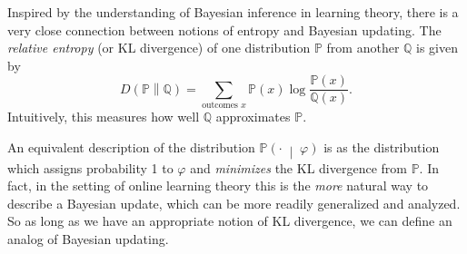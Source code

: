 \documentclass[12pt]{article}
\theoremstyle{definition}
\newcommand{\QQ}{\mathbb{Q}}
\newcommand{\Q}[1]{\QQ\of{#1}}
\newcommand{\of}[1]{\left(#1\right)}
\newcommand{\ofc}[2]{\left(#1\;\middle\vert\;#2\right)}
\newcommand{\ofcc}[2]{\left(#1\middle\| #2\right)}
\newcommand{\PP}{\mathbb{P}}
\newcommand{\Pc}[2]{\PP\ofc{#1}{#2}}
\renewcommand{\P}[1]{\mathbb{P}\of{#1}}
\newcommand{\vp}{\varphi}
\begin{document}
%
%
%
%

Inspired by the understanding of Bayesian inference
in learning theory,
there is a very close connection between notions of entropy
and Bayesian updating.
The \emph{relative entropy} (or KL divergence) of one distribution $\PP$ from another $\QQ$
is given by
\newcommand{\KL}[2]{D\ofcc{#1}{#2}}
\[ \KL{\PP}{\QQ} = \sum_{\text{outcomes }x} \P{x} \log{\frac {\P{x}}{\Q{x}}}.\]
Intuitively, this measures how well $\QQ$ approximates $\PP$.

An equivalent description of the distribution $\Pc{\cdot}{\vp}$
is as the distribution which assigns probability 1 to $\vp$
and \emph{minimizes} the KL divergence from $\PP$.
In fact, in the setting of online learning theory this is the \emph{more}
natural way to describe a Bayesian update,
which can be more readily generalized and analyzed.
So as long as we have an appropriate notion of KL divergence,
we can define an analog of Bayesian updating.
\end{document}
